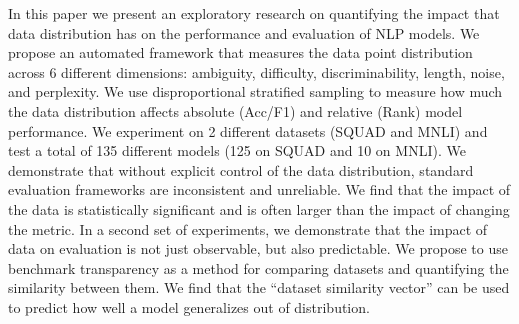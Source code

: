 In this paper we present an exploratory research on quantifying the impact that data distribution has on the performance and evaluation of NLP models. We propose an automated framework that measures the data point distribution across 6 different dimensions: ambiguity, difficulty, discriminability, length, noise, and perplexity. We use disproportional stratified sampling to measure how much the data distribution affects absolute (Acc/F1) and relative (Rank) model performance.  We experiment on 2 different datasets (SQUAD and MNLI) and test a total of 135 different models (125 on SQUAD and 10 on MNLI).  We demonstrate that without explicit control of the data distribution, standard evaluation frameworks are inconsistent and unreliable. We find that the impact of the data is statistically significant and is often larger than the impact of changing the metric.  In a second set of experiments, we demonstrate that the impact of data on evaluation is not just observable, but also predictable. We propose to use benchmark transparency as a method for comparing datasets and quantifying the similarity between them. We find that the ``dataset similarity vector'' can be used to predict how well a model generalizes out of distribution.